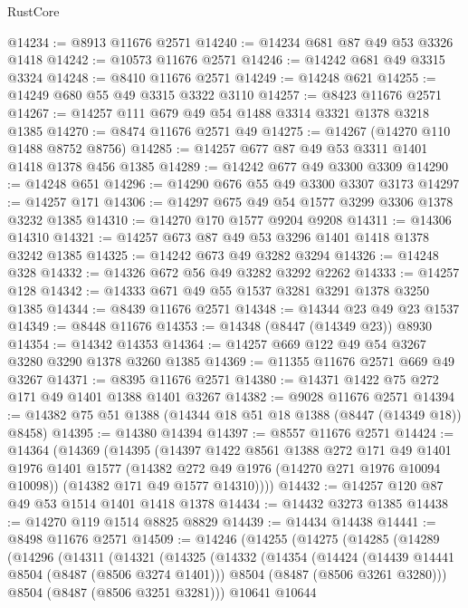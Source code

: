 \begin{lexlean}{RustCore}
\begin{coremodule}
@14234 := @8913 @11676 @2571
@14240 := @14234 @681 @87 @49 @53 @3326 @1418
@14242 := @10573 @11676 @2571
@14246 := @14242 @681 @49 @3315 @3324
@14248 := @8410 @11676 @2571
@14249 := @14248 @621
@14255 := @14249 @680 @55 @49 @3315 @3322 @3110
@14257 := @8423 @11676 @2571
@14267 := @14257 @111 @679 @49 @54 @1488 @3314 @3321 @1378 @3218 @1385
@14270 := @8474 @11676 @2571 @49
@14275 := @14267 (@14270 @110 @1488 @8752 @8756)
@14285 := @14257 @677 @87 @49 @53 @3311 @1401 @1418 @1378 @456 @1385
@14289 := @14242 @677 @49 @3300 @3309
@14290 := @14248 @651
@14296 := @14290 @676 @55 @49 @3300 @3307 @3173
@14297 := @14257 @171
@14306 := @14297 @675 @49 @54 @1577 @3299 @3306 @1378 @3232 @1385
@14310 := @14270 @170 @1577 @9204 @9208
@14311 := @14306 @14310
@14321 := @14257 @673 @87 @49 @53 @3296 @1401 @1418 @1378 @3242 @1385
@14325 := @14242 @673 @49 @3282 @3294
@14326 := @14248 @328
@14332 := @14326 @672 @56 @49 @3282 @3292 @2262
@14333 := @14257 @128
@14342 := @14333 @671 @49 @55 @1537 @3281 @3291 @1378 @3250 @1385
@14344 := @8439 @11676 @2571
@14348 := @14344 @23 @49 @23 @1537
@14349 := @8448 @11676
@14353 := @14348 (@8447 (@14349 @23)) @8930
@14354 := @14342 @14353
@14364 := @14257 @669 @122 @49 @54 @3267 @3280 @3290 @1378 @3260 @1385
@14369 := @11355 @11676 @2571 @669 @49 @3267
@14371 := @8395 @11676 @2571
@14380 := @14371 @1422 @75 @272 @171 @49 @1401 @1388 @1401 @3267
@14382 := @9028 @11676 @2571
@14394 := @14382 @75 @51 @1388 (@14344 @18 @51 @18 @1388 (@8447 (@14349 @18)) @8458)
@14395 := @14380 @14394
@14397 := @8557 @11676 @2571
@14424 := @14364
    (@14369
      (@14395
        (@14397
          @1422
          @8561
          @1388
          @272
          @171
          @49
          @1401
          @1976
          @1401
          @1577
          (@14382 @272 @49 @1976 (@14270 @271 @1976 @10094 @10098))
          (@14382 @171 @49 @1577 @14310))))
@14432 := @14257 @120 @87 @49 @53 @1514 @1401 @1418 @1378
@14434 := @14432 @3273 @1385
@14438 := @14270 @119 @1514 @8825 @8829
@14439 := @14434 @14438
@14441 := @8498 @11676 @2571
@14509 := @14246
    (@14255
      (@14275
        (@14285
          (@14289
            (@14296
              (@14311
                (@14321
                  (@14325
                    (@14332
                      (@14354
                        (@14424
                          (@14439 @14441 @8504 (@8487 (@8506 @3274 @1401)))
                          @8504
                          (@8487 (@8506 @3261 @3280)))
                        @8504
                        (@8487 (@8506 @3251 @3281)))
                      @10641
                      @10644

\end{coremodule}
\end{lexlean}

